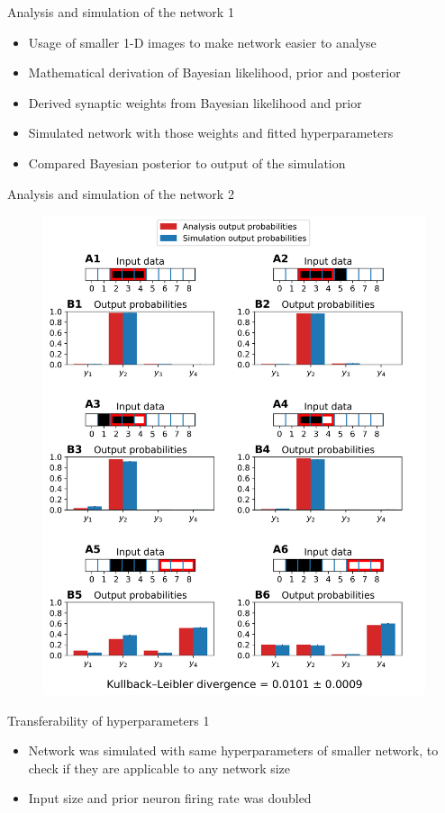 \documentclass[aspectratio=169]{beamer}
\begin{document}
\begin{frame}{Analysis and
 simulation of the network 1}
	\begin{itemize}
	  \item Usage of smaller 1-D images to make network easier to analyse 
	  \item Mathematical derivation of Bayesian likelihood, prior and posterior
	  \item Derived synaptic weights from Bayesian likelihood and prior
	  \item Simulated network with those weights and fitted hyperparameters
	  \item Compared Bayesian posterior to output of the simulation
	\end{itemize}
\end{frame}

\begin{frame}{Analysis and
 simulation of the network 2}
 \vspace{-1.0cm}
		\begin{figure}
        \includegraphics[width=0.35\linewidth]{../Latex/figures/1D/1D_98_440_4.png}
      \end{figure} 
\end{frame}

\begin{frame}{Transferability of hyperparameters 1}
  \begin{itemize}
      \item Network was simulated with same hyperparameters of smaller network, to check if they are applicable to any network size
    \item Input size and prior neuron firing rate  was doubled
  \end{itemize}
\end{frame}
\end{document}
